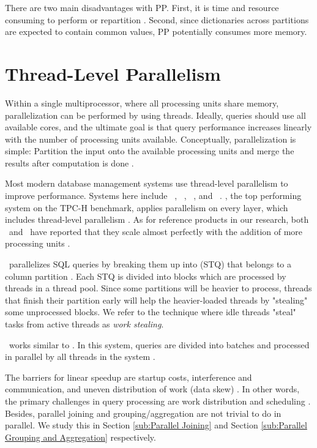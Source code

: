 There are two main disadvantages with PP. First, it is time and resource consuming to perform or repartition . Second, since dictionaries across partitions are expected to contain common values, PP potentially consumes more memory.

\section{Thread-Level Parallelism}
\label{sec:Thread-lever Parallelism}
Within a single multiprocessor, where all processing units share memory, parallelization can be performed by using threads. Ideally, queries should use all available cores, and the ultimate goal is that query performance increases linearly with the number of processing units available. Conceptually, parallelization is simple: Partition the input onto the available processing units and merge the results after computation is done \cite{Neumann2011-uq}.

Most modern database management systems use thread-level parallelism to improve performance. Systems here include \vertica~\cite{Lamb2012-kg}, \mssql~\cite{Larson2013-mc}, \blink~\cite{Barber2012-xt, Johnson2008-cp}, and \saph~\cite{Farber2012-vh}. \exasol, the top performing system on the TPC-H benchmark, applies parallelism on every layer, which includes thread-level parallelism \cite{Exasol2014-xh}. As for reference products in our research, both \qlikview~and \tableau~have reported that they scale almost perfectly with the addition of more processing units \cite{Kamkolkar2015-iq, Qlik2011-ef}. 

\blink~parallelizes SQL queries by breaking them up into  (STQ) that belongs to a column partition \cite{Barber2012-xt}. Each STQ is divided into blocks which are processed by threads in a thread pool. Since some partitions will be heavier to process, threads that finish their partition early will help the heavier-loaded threads by "stealing" some unprocessed blocks. We refer to the technique where idle threads "steal" tasks from active threads as \textit{work stealing}. 

\mssql~works similar to \blink. In this system, queries are divided into batches and processed in parallel by all threads in the system \cite{Larson2013-mc}.

The barriers for linear speedup are startup costs, interference and communication, and uneven distribution of work (data skew) \cite{DeWitt1992-ki}. In other words, the primary challenges in query processing are work distribution and scheduling \cite{Neumann2011-uq}. Besides, parallel joining and grouping/aggregation are not trivial to do in parallel. We study this in Section \ref{sub:Parallel Joining} and Section \ref{sub:Parallel Grouping and Aggregation} respectively.

